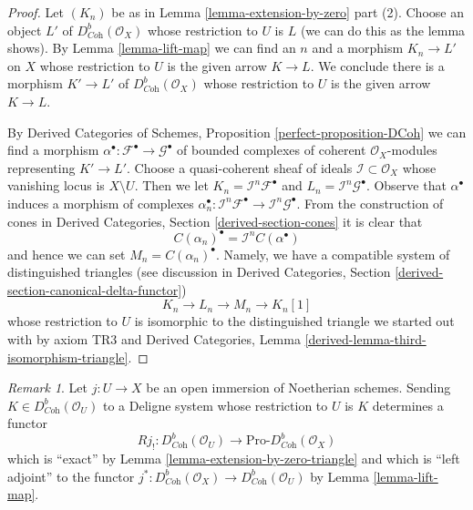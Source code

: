 \documentclass{stacks-project}
\theoremstyle{plain}
\theoremstyle{definition}
\theoremstyle{remark}
\newtheorem{remark}[subsection]{Remark}
\numberwithin{equation}{subsection}
\begin{document}
\begin{proof}
Let $(K_n)$ be as in Lemma \ref{lemma-extension-by-zero} part (2).
Choose an object $L'$ of $D^b_{\textit{Coh}}(\mathcal{O}_X)$
whose restriction to $U$ is $L$ (we can do this as the lemma shows).
By Lemma \ref{lemma-lift-map} we can find an $n$ and a morphism
$K_n \to L'$ on $X$ whose restriction to $U$ is the given arrow
$K \to L$. We conclude there is a morphism $K' \to L'$ of
$D^b_{\textit{Coh}}(\mathcal{O}_X)$ whose restriction to $U$
is the given arrow $K \to L$.

\medskip\noindent
By Derived Categories of Schemes, Proposition \ref{perfect-proposition-DCoh}
we can find a morphism $\alpha^\bullet : \mathcal{F}^\bullet \to
\mathcal{G}^\bullet$ of bounded complexes
of coherent $\mathcal{O}_X$-modules representing $K' \to L'$.
Choose a quasi-coherent sheaf of ideals $\mathcal{I} \subset \mathcal{O}_X$
whose vanishing locus is $X \setminus U$.
Then we let
$K_n = \mathcal{I}^n\mathcal{F}^\bullet$
and
$L_n = \mathcal{I}^n\mathcal{G}^\bullet$.
Observe that $\alpha^\bullet$ induces a morphism of
complexes $\alpha_n^\bullet : \mathcal{I}^n\mathcal{F}^\bullet \to
\mathcal{I}^n\mathcal{G}^\bullet$. From the construction of cones in
Derived Categories, Section \ref{derived-section-cones}
it is clear that
$$
C(\alpha_n)^\bullet = \mathcal{I}^nC(\alpha^\bullet)
$$
and hence we can set $M_n = C(\alpha_n)^\bullet$. Namely, we
have a compatible system of distinguished triangles
(see discussion in Derived Categories, Section
\ref{derived-section-canonical-delta-functor})
$$
K_n \to L_n \to M_n \to K_n[1]
$$
whose restriction to $U$ is isomorphic to the distinguished 
triangle we started out with by axiom TR3 and Derived Categories,
Lemma \ref{derived-lemma-third-isomorphism-triangle}.
\end{proof}

\begin{remark}
\label{remark-extension-by-zero}
Let $j : U \to X$ be an open immersion of Noetherian schemes.
Sending $K \in D^b_{\textit{Coh}}(\mathcal{O}_U)$ to a Deligne
system whose restriction to $U$ is $K$ determines a functor
$$
Rj_! :
D^b_{\textit{Coh}}(\mathcal{O}_U)
\longrightarrow
\text{Pro-}D^b_{\textit{Coh}}(\mathcal{O}_X)
$$
which is ``exact'' by Lemma \ref{lemma-extension-by-zero-triangle} and
which is
``left adjoint'' to the functor
$j^* : D^b_{\textit{Coh}}(\mathcal{O}_X) \to
D^b_{\textit{Coh}}(\mathcal{O}_U)$ by Lemma \ref{lemma-lift-map}.
\end{remark}
\end{document}
